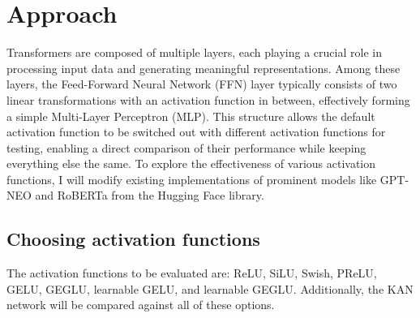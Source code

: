 \section{Approach}




Transformers are composed of multiple layers, each playing a crucial role in processing input data and generating meaningful representations. Among these layers, the Feed-Forward Neural Network (FFN) layer typically consists of two linear transformations with an activation function in between, effectively forming a simple Multi-Layer Perceptron (MLP). This structure allows the default activation function to be switched out with different activation functions for testing, enabling a direct comparison of their performance while keeping everything else the same. To explore the effectiveness of various activation functions, I will modify existing implementations of prominent models like GPT-NEO and RoBERTa from the Hugging Face library.

\subsection{Choosing activation functions}
The activation functions to be evaluated are: ReLU, SiLU, Swish, PReLU, GELU, GEGLU, learnable GELU, and learnable GEGLU. Additionally, the KAN network will be compared against all of these options.

